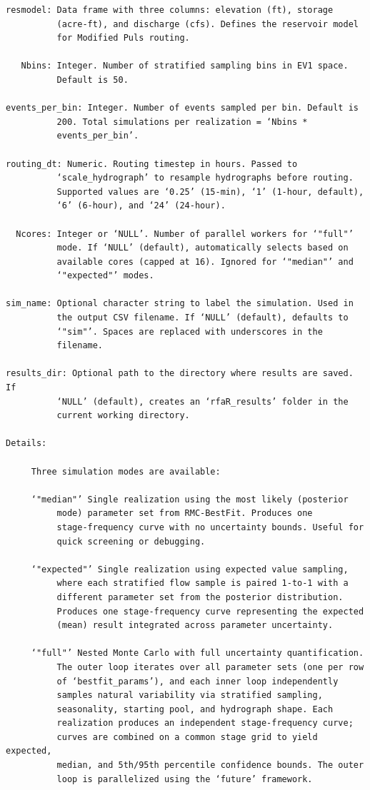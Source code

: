 \documentclass[
  letterpaper,
  DIV=11,
  numbers=noendperiod]{scrreprt}
\begin{document}
\begin{verbatim}
resmodel: Data frame with three columns: elevation (ft), storage
          (acre-ft), and discharge (cfs). Defines the reservoir model
          for Modified Puls routing.

   Nbins: Integer. Number of stratified sampling bins in EV1 space.
          Default is 50.

events_per_bin: Integer. Number of events sampled per bin. Default is
          200. Total simulations per realization = ‘Nbins *
          events_per_bin’.

routing_dt: Numeric. Routing timestep in hours. Passed to
          ‘scale_hydrograph’ to resample hydrographs before routing.
          Supported values are ‘0.25’ (15-min), ‘1’ (1-hour, default),
          ‘6’ (6-hour), and ‘24’ (24-hour).

  Ncores: Integer or ‘NULL’. Number of parallel workers for ‘"full"’
          mode. If ‘NULL’ (default), automatically selects based on
          available cores (capped at 16). Ignored for ‘"median"’ and
          ‘"expected"’ modes.

sim_name: Optional character string to label the simulation. Used in
          the output CSV filename. If ‘NULL’ (default), defaults to
          ‘"sim"’. Spaces are replaced with underscores in the
          filename.

results_dir: Optional path to the directory where results are saved. If
          ‘NULL’ (default), creates an ‘rfaR_results’ folder in the
          current working directory.

Details:

     Three simulation modes are available:

     ‘"median"’ Single realization using the most likely (posterior
          mode) parameter set from RMC-BestFit. Produces one
          stage-frequency curve with no uncertainty bounds. Useful for
          quick screening or debugging.

     ‘"expected"’ Single realization using expected value sampling,
          where each stratified flow sample is paired 1-to-1 with a
          different parameter set from the posterior distribution.
          Produces one stage-frequency curve representing the expected
          (mean) result integrated across parameter uncertainty.

     ‘"full"’ Nested Monte Carlo with full uncertainty quantification.
          The outer loop iterates over all parameter sets (one per row
          of ‘bestfit_params’), and each inner loop independently
          samples natural variability via stratified sampling,
          seasonality, starting pool, and hydrograph shape. Each
          realization produces an independent stage-frequency curve;
          curves are combined on a common stage grid to yield expected,
          median, and 5th/95th percentile confidence bounds. The outer
          loop is parallelized using the ‘future’ framework.


\end{verbatim}
\end{document}
